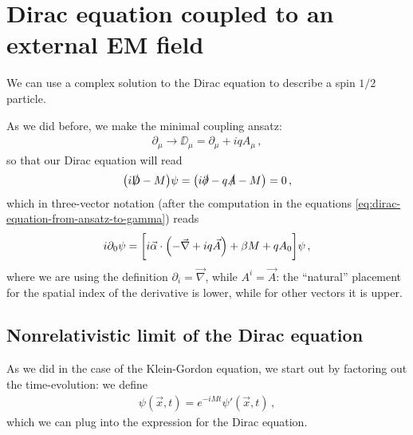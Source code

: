 \documentclass[main.tex]{subfiles}
\begin{document}
\section{Dirac equation coupled to an external EM field}


We can use a complex solution to the Dirac equation to describe a spin \(1/2\) particle.

As we did before, we make the minimal coupling ansatz: 
%
\begin{align}
\partial_{\mu } \to \DD_{\mu } = \partial_{\mu } + i q A_{\mu } 
\,,
\end{align}
%
so that our Dirac equation will read 
%
\begin{align}
\qty(i\slashed{\mathrm{D}} - M ) \psi = \qty(i \slashed{\partial} - q \slashed{A} - M ) = 0
\,,
\end{align}
%
which in three-vector notation (after the computation in the equations \eqref{eq:dirac-equation-from-ansatz-to-gamma}) reads 
%
\begin{align}
i \partial_0 \psi = \qty[i \vec{\alpha} \cdot \qty(- \vec{\nabla} + i q \vec{A}) + \beta M + q A_0 ] \psi 
\,,
\end{align}
%
where we are using the definition \(\partial_{i} = \vec{\nabla}\), while \(A^{i} = \vec{A} \): the ``natural'' placement for the spatial index of the derivative is lower, while for other vectors it is upper.

\subsection{Nonrelativistic limit of the Dirac equation}

As we did in the case of the Klein-Gordon equation, we start out by factoring out the time-evolution: we define 
%
\begin{align}
\psi (\vec{x}, t) = e^{-i M t} \psi' (\vec{x}, t)
\,,
\end{align}
%
which we can plug into the expression for the Dirac equation.
\end{document}
